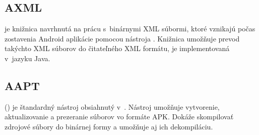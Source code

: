 \subsection{AXML}
\label{AXML}
 je knižnica navrhnutá na prácu s~binárnymi XML súbormi, ktoré vznikajú počas zostavenia Android aplikácie pomocou nástroja . Knižnica umožňuje prevod takýchto XML súborov do čitateľného XML formátu, je implementovaná v~jazyku Java.


\subsection{AAPT}
\label{AAPT}

 () je štandardný nástroj obsiahnutý v~. Nástroj  umožňuje vytvorenie, aktualizovanie a prezeranie súborov vo formáte APK. Dokáže skompilovať zdrojové súbory do binárnej formy a umožňuje aj ich dekompiláciu\cite{aapt}.

